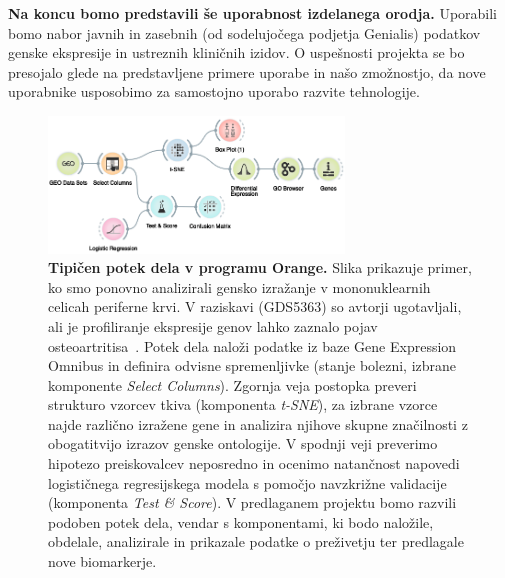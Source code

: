 \documentclass[11pt,a4paper]{article}
\renewcommand{\bold}{\textbf}
\begin{document}
\bold{Na koncu bomo predstavili še uporabnost izdelanega orodja.} Uporabili bomo nabor javnih in zasebnih (od sodelujočega podjetja Genialis) podatkov genske ekspresije in ustreznih kliničnih izidov. O uspešnosti projekta se bo presojalo glede na predstavljene primere uporabe in našo zmožnostjo, da nove uporabnike usposobimo za samostojno uporabo razvite tehnologije.

\begin{figure}[htbp]
\includegraphics[width=0.7\textwidth]{orange-workflow}
\caption{\small\bold{Tipičen potek dela v programu Orange.} Slika prikazuje primer, ko smo ponovno analizirali gensko izražanje v mononuklearnih celicah periferne krvi. V raziskavi (GDS5363) so avtorji ugotavljali, ali je profiliranje ekspresije genov lahko zaznalo pojav osteoartritisa~\cite{Ramos2014}. Potek dela naloži podatke iz baze Gene Expression Omnibus in definira odvisne spremenljivke (stanje bolezni, izbrane komponente {\em Select Columns}). Zgornja veja postopka preveri strukturo vzorcev tkiva (komponenta {\em t-SNE}), za izbrane vzorce najde različno izražene gene in analizira njihove skupne značilnosti z obogatitvijo izrazov genske ontologije. V spodnji veji preverimo hipotezo preiskovalcev neposredno in ocenimo natančnost napovedi logističnega regresijskega modela s pomočjo navzkrižne validacije (komponenta {\em Test \& Score}). V predlaganem projektu bomo razvili podoben potek dela, vendar s komponentami, ki bodo naložile, obdelale, analizirale in prikazale podatke o preživetju ter predlagale nove biomarkerje.}
\label{fig:orange-workflow}
\end{figure}
\end{document}
